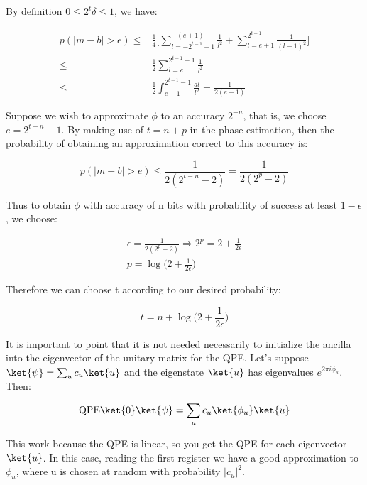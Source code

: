 By definition $0 \leq 2^t \delta \leq 1$, we have:

\begin{equation}
    \begin{split}
    p(|m - b| > e) \leq & \frac{1}{4} \bigg[\sum_{l=-2^{t-1} + 1}^{-(e+1)} \frac{1}{l^2} + \sum_{l=e+1}^{2^{t-1}} \frac{1}{(l-1)^2}  \bigg] \\
    \leq & \frac{1}{2} \sum_{l=e}^{2^{t-1} - 1} \frac{1}{l^2} \\
    \leq & \frac{1}{2} \int_{e-1}^{2^{t-1}-1} \frac{dl}{l^2} = \frac{1}{2(e-1)}
    \end{split}
\end{equation}

Suppose we wish to approximate $\phi$ to an accuracy $2^{-n}$, that is, we choose $e = 2^{t-n} - 1$. By making use of $t = n+p$ in the phase estimation, then the probability of obtaining an approximation correct to this accuracy is:

\begin{equation}
    p(|m-b|>e) \leq \frac{1}{2(2^{t-n} - 2)} = \frac{1}{2(2^p - 2)}
\end{equation}

Thus to obtain $\phi$ with accuracy of n bits with probability of success at least $1 - \epsilon$, we choose:

\begin{equation}
    \begin{split}
    \epsilon = \frac{1}{2(2^p - 2)} \Rightarrow 2^p = 2 + \frac{1}{2\epsilon} \\
    p = \log \bigg( 2 + \frac{1}{2\epsilon} \bigg)
    \end{split}
\end{equation}

Therefore we can choose t according to our desired probability:

\begin{equation}
    \label{Eq: QPE probability}
    t = n + \log \bigg( 2 + \frac{1}{2\epsilon} \bigg)
\end{equation}

It is important to point that it is not needed necessarily to initialize the ancilla into the eigenvector of the unitary matrix for the QPE. Let's suppose $\ket{\psi} = \sum_u c_u \ket{u}$ and the eigenstate $\ket{u}$ has eigenvalues $e^{2 \pi i \phi_u}$. Then:

\begin{equation}
    \mathrm{QPE} \ket{0}\ket{\psi} = \sum_u c_u \ket{\phi_u} \ket{u}
\end{equation}

This work because the QPE is linear, so you get the QPE for each eigenvector $\ket{u}$. In this case, reading the first register we have a good approximation to $\phi_u$, where u is chosen at random with probability $|c_u|^2$.